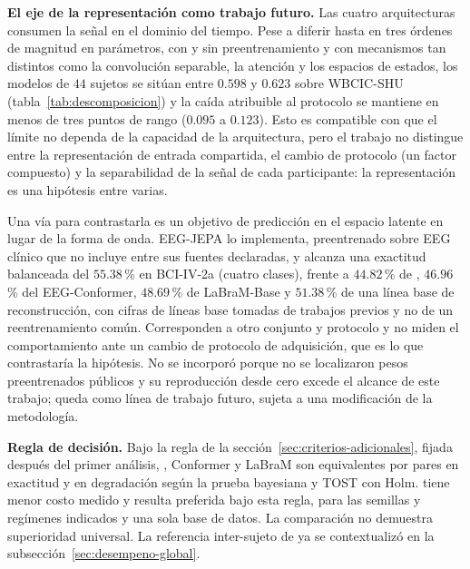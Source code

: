 \textbf{El eje de la representación como trabajo futuro.} Las cuatro arquitecturas consumen la señal en el
dominio del tiempo. Pese a diferir hasta en tres órdenes de magnitud en parámetros, con y sin preentrenamiento y
con mecanismos tan distintos como la convolución separable, la atención y los espacios de estados, los modelos de
$44$ sujetos se sitúan entre $0.598$ y $0.623$ sobre WBCIC-SHU (tabla~\ref{tab:descomposicion}) y la caída
atribuible al protocolo se mantiene en menos de tres puntos de rango ($0.095$ a $0.123$). Esto es compatible
con que el límite no dependa de la capacidad de la arquitectura, pero el trabajo no distingue entre la
representación de entrada compartida, el cambio de protocolo (un factor compuesto) y la separabilidad de la
señal de cada participante: la representación es una hipótesis entre varias.

Una vía para contrastarla es un objetivo de predicción en el espacio latente en lugar de la forma de onda.
EEG-JEPA \cite{li2026eegjepa} lo implementa, preentrenado sobre EEG clínico que no incluye \openbmi{} entre sus
fuentes declaradas, y alcanza una exactitud balanceada del $55.38$\,\% en BCI-IV-2a (cuatro clases), frente a
$44.82$\,\% de \eegnet{}, $46.96$\,\% del EEG-Conformer, $48.69$\,\% de LaBraM-Base y $51.38$\,\% de una línea
base de reconstrucción, con cifras de líneas base tomadas de trabajos previos y no de un reentrenamiento común.
Corresponden a otro conjunto y protocolo y no miden el comportamiento ante un cambio de protocolo de
adquisición, que es lo que contrastaría la hipótesis. No se incorporó porque no se localizaron pesos
preentrenados públicos y su reproducción desde cero excede el alcance de este trabajo; queda como línea de
trabajo futuro, sujeta a una modificación de la metodología.




\textbf{Regla de decisión.} Bajo la regla de la sección~\ref{sec:criterios-adicionales}, fijada después del primer análisis, \eegnet{}, Conformer y LaBraM son equivalentes por pares en exactitud \loso{} y en degradación según la prueba bayesiana y TOST con Holm. \eegnet{} tiene menor costo medido y resulta preferida bajo esta regla, para las semillas y regímenes indicados y una sola base de datos. La comparación no demuestra superioridad universal. La referencia inter-sujeto de \cite{kwon2020} ya se contextualizó en la subsección~\ref{sec:desempeno-global}.
